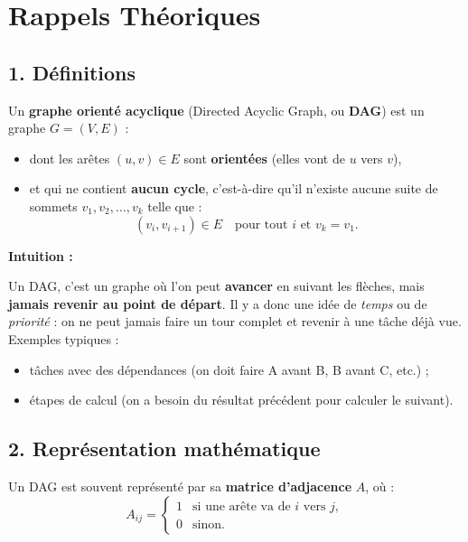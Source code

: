 
\section*{Rappels Théoriques}

\subsection*{1. Définitions}

Un \textbf{graphe orienté acyclique} (Directed Acyclic Graph, ou \textbf{DAG}) est un graphe $G = (V,E)$ :
\begin{itemize}
    \item dont les arêtes $(u,v) \in E$ sont \textbf{orientées} (elles vont de $u$ vers $v$),
    \item et qui ne contient \textbf{aucun cycle}, c'est-à-dire qu'il n'existe aucune suite de sommets $v_1,v_2,\dots,v_k$ telle que :
    \[
        (v_i, v_{i+1}) \in E \quad \text{pour tout $i$ et } v_k = v_1.
    \]
\end{itemize}

\textbf{Intuition :} 

Un DAG, c'est un graphe où l'on peut \textbf{avancer} en suivant les flèches, mais \textbf{jamais revenir au point de départ}.  
Il y a donc une idée de \emph{temps} ou de \emph{priorité} : 
on ne peut jamais faire un tour complet et revenir à une tâche déjà vue. \\

Exemples typiques :
\begin{itemize}
    \item tâches avec des dépendances (on doit faire A avant B, B avant C, etc.) ;
    \item étapes de calcul (on a besoin du résultat précédent pour calculer le suivant).
\end{itemize}

\subsection*{2. Représentation mathématique}

Un DAG est souvent représenté par sa \textbf{matrice d'adjacence} $A$, où :
\[
A_{ij} = 
\begin{cases}
    1 & \text{si une arête va de $i$ vers $j$}, \\
    0 & \text{sinon.}
\end{cases}
\]

